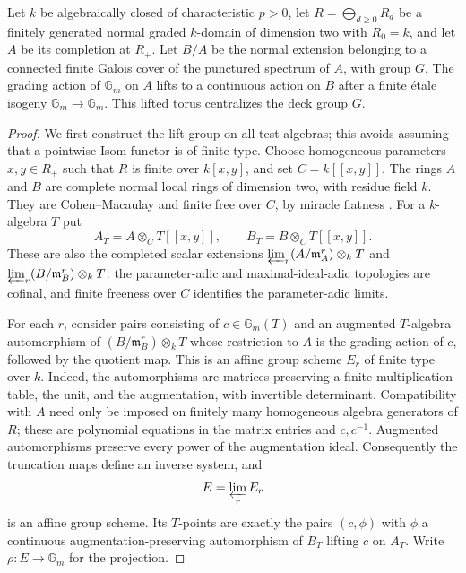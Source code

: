 \begin{lemma}
\label{D:formal-torus-lift}
Let $k$ be algebraically closed of characteristic $p>0$, let
$R=\bigoplus_{d\geq0}R_d$ be a finitely generated normal graded
$k$-domain of dimension two with $R_0=k$, and let $A$ be its
completion at $R_+$.  Let $B/A$ be the normal extension belonging
to a connected finite Galois cover of the punctured spectrum of
$A$, with group $G$.  The grading action of $\mathbb G_m$ on
$A$ lifts to a continuous action on $B$ after a finite \'etale
isogeny $\mathbb G_m\to\mathbb G_m$.  This lifted torus
centralizes the deck group $G$.
\end{lemma}
\begin{proof}
We first construct the lift group on all test algebras; this
avoids assuming that a pointwise Isom functor is of finite type.
Choose homogeneous parameters $x,y\in R_+$ such that $R$ is
finite over $k[x,y]$, and set $C=k[[x,y]]$.  The rings $A$ and
$B$ are complete normal local rings of dimension two, with
residue field $k$.  They are Cohen--Macaulay and finite free over
$C$, by miracle flatness
\cite[tags 0B3D and 00R4]{C_StacksFormalLift}.
For a $k$-algebra $T$ put
\[
 A_T=A\otimes_C T[[x,y]],\qquad
 B_T=B\otimes_C T[[x,y]].
\]
These are also the completed scalar extensions
$\varprojlim_r(A/\mathfrak m_A^r)\otimes_kT$ and
$\varprojlim_r(B/\mathfrak m_B^r)\otimes_kT$:
the parameter-adic and maximal-ideal-adic topologies are cofinal,
and finite freeness over $C$ identifies the parameter-adic limits.

For each $r$, consider pairs consisting of $c\in\mathbb G_m(T)$
and an augmented $T$-algebra automorphism of
$(B/\mathfrak m_B^r)\otimes_kT$ whose restriction to $A$
is the grading action of $c$, followed by the quotient map.
This is an affine group scheme $E_r$ of finite type over $k$.
Indeed, the automorphisms are matrices preserving a finite
multiplication table, the unit, and the augmentation, with
invertible determinant.  Compatibility with $A$ need only be
imposed on finitely many homogeneous algebra generators of $R$;
these are polynomial equations in the matrix entries and
$c,c^{-1}$.  Augmented automorphisms preserve every power of the
augmentation ideal.  Consequently the truncation maps define
an inverse system, and
\[
 E=\varprojlim_r E_r
\]
is an affine group scheme.  Its $T$-points are exactly the pairs
$(c,\phi)$ with $\phi$ a continuous augmentation-preserving
automorphism of $B_T$ lifting $c$ on $A_T$.  Write
$\rho:E\to\mathbb G_m$ for the projection.


\end{proof}
